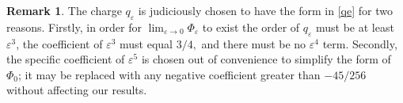 \documentclass[12pt,a4paper]{article}
\theoremstyle{plain}
\theoremstyle{definition}
\newtheorem{rmk}{Remark}
\begin{document}
	
	
	\begin{rmk}
		The charge \(q_\varepsilon\) is judiciously chosen to have the form in \eqref{qe} for two reasons. Firstly, in order for \(\lim_{\varepsilon\rightarrow 0}\Phi_\varepsilon\) to exist the order of \(q_\varepsilon\) must be at least \(\varepsilon^3\), the coefficient of \(\varepsilon^3\) must equal $3/4,$ and there must be no $\varepsilon^4$ term. Secondly, the specific coefficient of \(\varepsilon^5\) is chosen out of convenience to simplify the form of \(\Phi_0\); it may be replaced with any negative coefficient greater than \(-45/256\) without affecting our results.
	\end{rmk}
	
\end{document}

